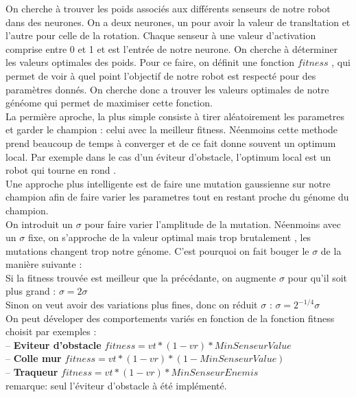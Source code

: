 \documentclass[11pt]{article}
\begin{document}
On cherche à trouver les poids associés aux différents senseurs de notre robot dans des neurones.
On a deux neurones, un pour avoir la valeur de transltation et l'autre pour celle de la rotation.
Chaque senseur à une valeur d'activation comprise entre 0 et 1 et est l'entrée de notre neurone.
On cherche à déterminer les valeurs optimales des poids. Pour ce faire, on définit une fonction $fitness$ , qui permet de voir à quel point l'objectif de notre robot est respecté pour des paramètres donnés. On cherche donc a trouver les valeurs optimales de notre généome qui permet de maximiser cette fonction. \\
La permière aproche, la plus simple consiste à tirer aléatoirement les parametres et garder le champion : celui avec la meilleur fitness. Néenmoins cette methode prend beaucoup de temps à converger et de ce fait donne souvent un optimum local.
Par exemple dans le cas d'un éviteur d'obstacle, l'optimum local est un robot qui tourne en rond .\\
Une approche plus intelligente est de faire une mutation gaussienne sur notre champion afin de faire varier les parametres tout en restant proche du génome du champion. \\
On introduit un $\sigma$ pour faire varier l'amplitude de la mutation. Néenmoins avec un $\sigma$ fixe, on s'approche de la valeur optimal mais trop brutalement , les mutations changent trop notre génome. C'est pourquoi on fait bouger le $\sigma$ de la manière suivante : \\
Si la fitness trouvée est meilleur que la précédante, on augmente $\sigma$ pour qu'il soit plus grand : 
$\sigma = 2\sigma$ \\
Sinon on veut avoir des variations plus fines, donc on réduit $\sigma$ : 
$\sigma = 2^{-1/4}\sigma$ \\
On peut déveloper des comportements variés en fonction de la fonction fitness choisit par exemples : \\
-- \textbf {Eviteur d'obstacle} $fitness=vt*(1-vr)*MinSenseurValue$ \\
-- \textbf {Colle mur} $fitness=vt*(1-vr)*(1-MinSenseurValue)$ \\
-- \textbf {Traqueur} $fitness=vt*(1-vr)*MinSenseurEnemis$ \\
remarque: seul l'éviteur d'obstacle à été implémenté.
\end{document}
